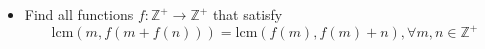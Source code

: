 \documentclass[11pt]{scrartcl}
\begin{document}
\begin{itemize}[label=,itemsep=0.4em,leftmargin=0em]
\begin{comment}
        We observe that $f$ does not take the value $1$. It can be easily proven that $f$ is injective. By comparing $P(n,m)$, we get 
        \[
            f^{f(n)}(m) = f^{f(m)}(n) , \forall m,n \in \mathbb{Z}^+
        \]
        Assume $f(n) \geq f(m)$, since $f$ is injective, we get 
        \[
            f^{f(n) - f(m)}(m) = n \tag{3}
        \]
        We prove that $f(1)$ is the smallest value of the function. Suppose there exists $a$ such that $f(a) < f(1)$, from $(3)$ substituting $P(1,a)$, we get 
        \[
            f^{f(1) - f(a)}(a) = 1
        \]
        which is a contradiction. Therefore, $f(1)$ is the smallest value. Hence, $f(2) > f(1)$. From $(3)$ substituting $P(1,2)$, we get 
        \[
            f^{f(2) - f(1)}(1) = 2
        \]
        Since $f(1) > 1$, we have $f(1) = 2$. From $(1)$ substituting $P(m,1)$, we get
        \[
            f(f(m)) + m = f(m), \forall m \in \mathbb{Z}^+ \tag{4}
        \]
        We will use induction to show that $f(m) = m + 1$. Assume $f(m - 1) = m$ for $m > 2$. From $(4)$, substituting $m \to m - 1$, we get
        \[
            f(f(m - 1)) + m = 2f(m - 1) \implies f(m) = m
        \]
        Thus, the only function that satisfies the conditions is $\boxed{f(m) = m, \forall m \in \mathbb{Z}^+}$.

    \end{comment} 


    \item \begin{btvn}
        Find all functions $f: \mathbb{Z^+} \to \mathbb{Z^+}$ that satisfy
        \[
        \text{lcm}(m, f(m+f(n)))=\text{lcm}(f(m), f(m)+n), \forall m,n \in \mathbb{Z}^+
        \tag{1}\]
    \end{btvn}
    \begin{comment}
        Denote $P(m,n)$ as the substitution into $(1)$.

        $P(m,mf(m))$ implies
        \[[m, f(m + f(mf(m)))] = [f(m), f(m) + mf(m)] = f(m)(m + 1), \forall m,n \in \bb{Z^+}\]
        From this, we deduce $m \mid f(m)(m + 1) \ra m \mid f(m) \ra f(m) \geq m (2)$

        $P(1,1)$ gives us $f(1 + f(1)) = f(1)(f(1) + 1)$

        $P(1, 1 + f(1))$ implies
        \[
        f(1 + f(1)^2 + f(1)) = [f(1), 2f(1) + 1] = 2f(1)^2 + f(1)
        \]
        From $(2)$, we deduce $1 + f(1)^2 + f(1) \mid 2f(1)^2 + f(1) \ra f(1) = 1$

        Using $(1)$, substituting $P(1,n)$ gives us $f(1 + f(n)) = n + 1 \geq 1 + f(n) \ra f(n) \leq n$


\end{comment}
\end{itemize}
\end{document}
